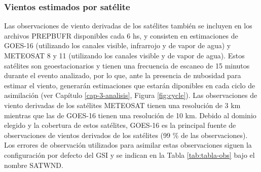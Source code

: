 \documentclass[12pt,oneside,a4paper]{reedthesis}
\begin{document}
\hypertarget{vientos-estimados-por-satuxe9lite}{%
\subsubsection{Vientos estimados por satélite}\label{vientos-estimados-por-satuxe9lite}}

Las observaciones de viento derivadas de los satélites también se incluyen en los archivos PREPBUFR disponibles cada 6 hs, y consisten en estimaciones de GOES-16 (utilizando los canales visible, infrarrojo y de vapor de agua) y METEOSAT 8 y 11 (utilizando los canales visible y de vapor de agua). Estos satélites son geoestacionarios y tienen una frecuencia de escaneo de 15 minutos durante el evento analizado, por lo que, ante la presencia de nubosidad para estimar el viento, generarán estimaciones que estarán diponibles en cada ciclo de asimilación (ver Capítulo \ref{cap-3-analisis}, Figura \ref{fig:cycle}). Las observaciones de viento derivadas de los satélites METEOSAT tienen una resolución de 3 km mientras que las de GOES-16 tienen una resolución de 10 km. Debido al dominio elegido y la cobertura de estos satélites, GOES-16 es la principal fuente de observaciones de vientos derivados de los satélites (99 \% de las observaciones). Los errores de observación utilizados para asimilar estas observaciones siguen la configuración por defecto del GSI y se indican en la Tabla \ref{tab:tabla-obs} bajo el nombre SATWND.
\end{document}
